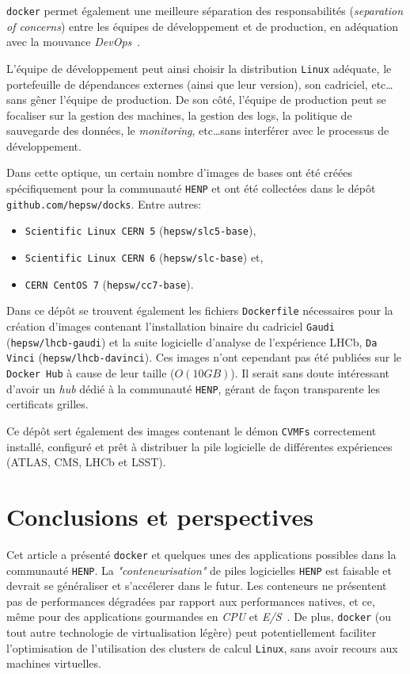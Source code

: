 \documentclass[a4paper]{article}
\begin{document}
\texttt{docker} permet \'egalement une meilleure s\'eparation des
responsabilit\'es (\emph{separation of concerns}) entre les \'equipes de
d\'eveloppement et de production, en ad\'equation avec la mouvance
\emph{DevOps}~\cite{ref-devops}.

L'\'equipe de d\'eveloppement peut ainsi choisir la distribution \texttt{Linux}
ad\'equate, le portefeuille de d\'ependances externes (ainsi que leur version),
son cadriciel, etc\ldots sans g\^ener l'\'equipe de production.
De son c\^ot\'e, l'\'equipe de production peut se focaliser sur la gestion des
machines, la gestion des logs, la politique de sauvegarde des donn\'ees, le
\emph{monitoring}, etc\ldots sans interf\'erer avec le processus
de d\'eveloppement.

Dans cette optique, un certain nombre d'images de bases ont \'et\'e cr\'e\'ees
sp\'ecifiquement pour la communaut\'e \texttt{HENP} et ont \'et\'e collect\'ees
dans le d\'ep\^ot \texttt{github.com/hepsw/docks}.
Entre autres:
\begin{itemize}
	\item \texttt{Scientific Linux CERN 5} (\texttt{hepsw/slc5-base}),
	\item \texttt{Scientific Linux CERN 6} (\texttt{hepsw/slc-base}) et,
	\item \texttt{CERN CentOS 7} (\texttt{hepsw/cc7-base}).
\end{itemize}

Dans ce d\'ep\^ot se trouvent \'egalement les fichiers \texttt{Dockerfile}
n\'ecessaires pour la cr\'eation d'images contenant l'installation binaire du
cadriciel \texttt{Gaudi}~\cite{ref-gaudi} (\texttt{hepsw/lhcb-gaudi}) et la
suite logicielle d'analyse de l'exp\'erience LHCb, \texttt{Da Vinci}
(\texttt{hepsw/lhcb-davinci}).
Ces images n'ont cependant pas \'et\'e publi\'ees sur le \texttt{Docker Hub} \`a
cause de leur taille ($O(10 GB)$).
Il serait sans doute int\'eressant d'avoir un \emph{hub} d\'edi\'e \`a la
communaut\'e \texttt{HENP}, g\'erant de fa\c con transparente les certificats
grilles.

Ce d\'ep\^ot sert \'egalement des images contenant le d\'emon \texttt{CVMFs}
correctement install\'e, configur\'e et pr\^et \`a distribuer la pile logicielle
de diff\'erentes exp\'eriences (ATLAS, CMS, LHCb et LSST).

\section*{Conclusions et perspectives}
Cet article a pr\'esent\'e \texttt{docker} et quelques unes des applications
possibles dans la communaut\'e \texttt{HENP}.
La \emph{"conteneurisation"} de piles logicielles \texttt{HENP} est faisable et
devrait se g\'en\'eraliser et s'acc\'elerer dans le futur.
Les conteneurs ne pr\'esentent pas de performances d\'egrad\'ees par rapport aux
performances natives, et ce, m\^eme pour des applications gourmandes en
\emph{CPU} et \emph{E/S}~\cite{ref-bench-0,ref-bench-1}.
De plus, \texttt{docker} (ou tout autre technologie de virtualisation
l\'eg\`ere) peut potentiellement faciliter l'optimisation de l'utilisation des clusters de calcul
\texttt{Linux}, sans avoir recours aux machines virtuelles.
\end{document}
